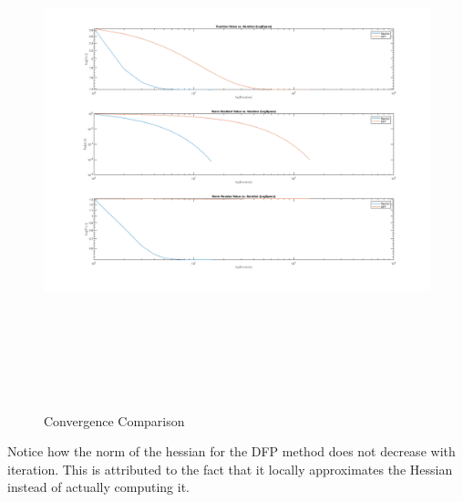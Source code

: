 \documentclass[answers]{exam}
\begin{document}
\begin{framed}
    
     \begin{figure}[H]
    \centering
    \caption{Convergence Comparison}
    \includegraphics[width=\linewidth, height=15cm]{Problem2_Newton.png}
    \end{figure} 
    
    
    Notice how the norm of the hessian for the DFP method does not decrease with iteration. This is attributed to the fact that it locally approximates the Hessian instead of actually computing it. 
    

\end{framed}
\end{document}
